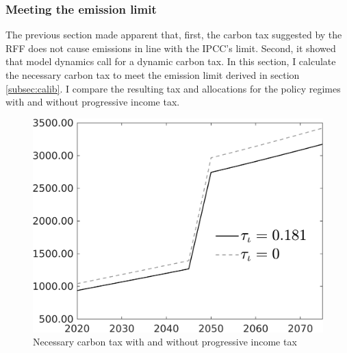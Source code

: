   
 \subsubsection{Meeting the emission limit}
 
 The previous section made apparent that, first, the carbon tax suggested by the RFF does not cause emissions in line with the IPCC's limit.  Second, it showed that model dynamics call for a dynamic carbon tax. In this section, I calculate the necessary carbon tax to meet the emission limit derived in section \ref{subsec:calib}. I compare the resulting tax and allocations for the policy regimes with and without progressive income tax. 
 

 \begin{figure}[h!!]
 	\centering
 	\caption{Necessary carbon tax with and without progressive income tax  }\label{fig:Limit_nsk0_xgr0_know}		
 	\begin{minipage}[]{0.32\textwidth}
 		\includegraphics[width=1\textwidth]{../../codding_model/own_basedOnFried/optimalPol_010922_revision/figures/all_13Sept22/CompTauf_bytaul_Reg0_Tauf_spillover0_nsk0_xgr0_knspil0_sep0_LFlimit1_emsbase0_countec0_GovRev0_etaa0.79_lgd1.png}
 	\end{minipage}		\begin{minipage}[]{0.32\textwidth}

\end{minipage}
\end{figure}
